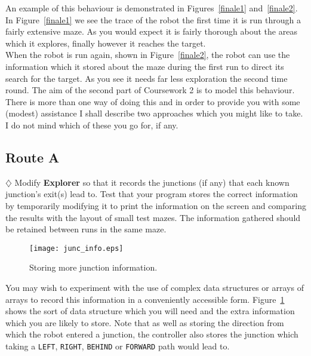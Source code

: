 \noindent
An example of this behaviour is demonstrated in Figures~\ref{finale1} 
and~\ref{finale2}. In Figure~\ref{finale1} we see the trace of the robot the 
first time it is run through a fairly extensive maze. As you would expect it 
is fairly thorough about the areas which it explores, 
finally however it reaches the target.\\

\noindent
When the robot is run again, shown in Figure~\ref{finale2}, the robot can 
use the information which it stored about the maze during the first run to 
direct its search for the target. As you see it needs far less exploration 
the second time round. The aim of the second part of Coursework 2 is to 
model this behaviour. \\

\noindent
There is more than one way of doing this and in order to provide you with 
some (modest) assistance I shall describe two approaches which you might 
like to take. I do not mind which of these you go for, if any.

\subsection{Route A}

$\diamondsuit$
Modify {\bf Explorer} so that it records the junctions (if any) 
that each known junction's exit(s) lead to. Test that your program stores the
correct information by temporarily modifying it to print the information on
the screen and comparing the results with the layout of small test mazes.
The information gathered should be retained between runs in the same maze.\\

\begin{figure}
\centering
\texttt{[image: junc\_info.eps]}
\caption{Storing more junction information.\label{7.1}}
\end{figure}

\noindent
You may wish to experiment with the use of complex data structures
or arrays of arrays
to record this information in a conveniently accessible form. Figure~\ref{7.1}
shows the sort of data structure which you will need and the extra information
which you are likely to store. Note that as well as storing the 
direction from which the robot entered a junction, the controller also stores 
the junction 
which taking a {\tt LEFT}, {\tt RIGHT}, {\tt BEHIND} or {\tt FORWARD} path 
would lead to. \\


